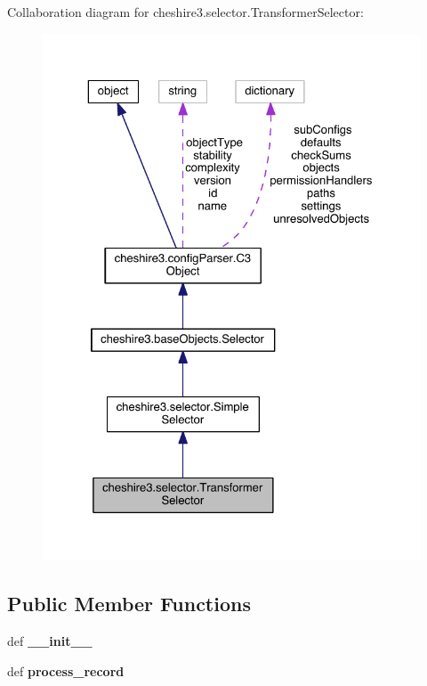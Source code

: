 Collaboration diagram for cheshire3.\-selector.\-Transformer\-Selector\-:
\nopagebreak
\begin{figure}[H]
\begin{center}
\leavevmode
\includegraphics[width=325pt]{classcheshire3_1_1selector_1_1_transformer_selector__coll__graph}
\end{center}
\end{figure}
\subsection*{Public Member Functions}
\begin{DoxyCompactItemize}
\item 
\hypertarget{classcheshire3_1_1selector_1_1_transformer_selector_a3a976bf428708a475546d3d1900a6a2b}{def {\bfseries \-\_\-\-\_\-init\-\_\-\-\_\-}}\label{classcheshire3_1_1selector_1_1_transformer_selector_a3a976bf428708a475546d3d1900a6a2b}

\item 
\hypertarget{classcheshire3_1_1selector_1_1_transformer_selector_a2d29b0e03248afa01219948caf256806}{def {\bfseries process\-\_\-record}}\label{classcheshire3_1_1selector_1_1_transformer_selector_a2d29b0e03248afa01219948caf256806}

\end{DoxyCompactItemize}
